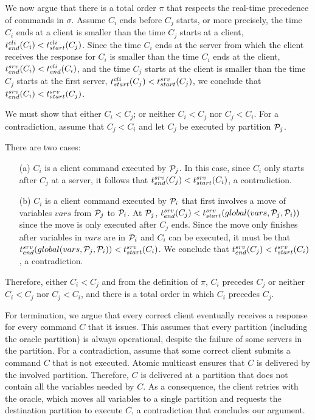 %
We now argue that there is a total order $\pi$ that respects the real-time
precedence of commands in $\sigma$. Assume $C_i$ ends before $C_j$ starts, or
more precisely, the time $C_i$ ends at a client is smaller than the time $C_j$
starts at a client, $t^{cli}_{end}(C_i) < t^{cli}_{start}(C_j)$. Since the time $C_i$ ends at the
server from which the client receives the response for $C_i$ is smaller than the
time $C_i$ ends at the client, $t^{srv}_{end}(C_i) < t^{cli}_{end}(C_i)$, and the time $C_j$
starts at the client is smaller than the time $C_j$ starts at the first server,
$t^{cli}_{start}(C_j) < t^{srv}_{start}(C_j)$, we conclude that $t^{srv}_{end}(C_i) < t^{srv}_{start}(C_j)$.

We must show that either $C_i < C_j$; or neither $C_i < C_j$ nor $C_j < C_i$.
For a contradiction, assume that $C_j <  C_i$ and let $C_j$ be executed by
partition $\mathcal{P}_j$.

There are two cases:
\begin{enumerate}
\item[(a)] $C_i$ is a client command executed by $\mathcal{P}_j$. In this case, since
$C_i$ only starts after $C_j$ at a server, it follows that $t^{srv}_{end}(C_j) <
t^{srv}_{start}(C_i)$, a contradiction.
\item[(b)] $C_i$ is a client command executed by $\mathcal{P}_i$ that first involves a
move of variables $vars$ from $\mathcal{P}_j$ to $\mathcal{P}_i$. At $\mathcal{P}_j$, $t^{srv}_{end}(C_j) <
t^{srv}_{start}(global(vars,\mathcal{P}_j,\mathcal{P}_i))$ since the move is only executed after $C_j$
ends. Since the move only finishes after variables in $vars$ are in $\mathcal{P}_i$ and
$C_i$ can be executed, it must be that
$t^{srv}_{end}(global(vars,\mathcal{P}_j,\mathcal{P}_i)) < t^{srv}_{start}(C_i)$. We conclude that $t^{srv}_{end}(C_j) <
t^{srv}_{start}(C_i)$, a contradiction.
\end{enumerate}
Therefore, either $C_i < C_j$ and from the definition of $\pi$, $C_i$ precedes
$C_j$ or neither $C_i < C_j$ nor $C_j < C_i$, and there is a total order in
which $C_i$ precedes $C_j$.

For termination, we argue that every correct client eventually receives a
response for every command $C$ that it issues. This assumes that every partition
(including the oracle partition) is always operational, despite the failure of
some servers in the partition. For a contradiction, assume that some correct
client submits a command $C$ that is not executed. Atomic multicast ensures that
$C$ is delivered by the involved partition. Therefore, $C$ is delivered at a
partition that does not contain all the variables needed by $C$. As a
consequence, the client retries with the oracle, which moves all variables to a
single partition and requests the destination partition to execute $C$, a
contradiction that concludes our argument.


